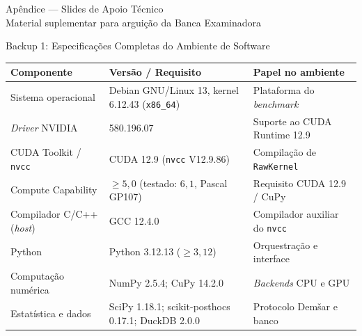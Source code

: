 
\begin{frame}[standout]
  Apêndice — Slides de Apoio Técnico\\
  {\normalsize\normalfont Material suplementar para arguição da Banca Examinadora}
\end{frame}

\begin{frame}{Backup 1: Especificações Completas do Ambiente de Software}
  \begin{slidetabela}
    \begin{tabular}{@{}lll@{}}
      \toprule
      \textbf{Componente} & \textbf{Versão / Requisito} & \textbf{Papel no ambiente} \\
      \midrule
      Sistema operacional            & Debian GNU/Linux 13, kernel 6.12.43 (\texttt{x86\_64}) & Plataforma do \emph{benchmark} \\
      \emph{Driver} NVIDIA           & 580.196.07                                             & Suporte ao CUDA Runtime 12.9 \\
      CUDA Toolkit / \texttt{nvcc}   & CUDA 12.9 (\texttt{nvcc} V12.9.86)                     & Compilação de \texttt{RawKernel} \\
      Compute Capability             & $\ge 5{,}0$ (testado: $6{,}1$, Pascal GP107)           & Requisito CUDA 12.9 / CuPy \\
      Compilador C/C++ (\emph{host}) & GCC 12.4.0                                             & Compilador auxiliar do \texttt{nvcc} \\
      Python                         & Python 3.12.13 ($\ge 3{,}12$)                          & Orquestração e interface \\
      Computação numérica            & NumPy 2.5.4; CuPy 14.2.0                               & \emph{Backends} CPU e GPU \\
      Estatística e dados            & SciPy 1.18.1; scikit-posthocs 0.17.1; DuckDB 2.0.0     & Protocolo Demšar e banco \\
      \bottomrule
    \end{tabular}
  \end{slidetabela}
\end{frame}


